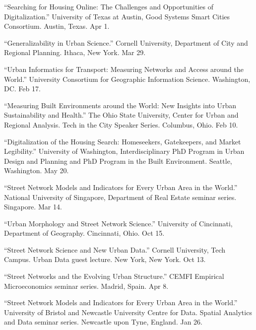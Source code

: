 \documentclass[11pt,a4paper]{report} %
\begin{document}
\begin{tablist}
\item[2024] \tab{}\enquote{Searching for Housing Online: The Challenges and Opportunities of Digitalization.} University of Texas at Austin, Good Systems Smart Cities Consortium. Austin, Texas. Apr 1.

\item[2024] \tab{}\enquote{Generalizability in Urban Science.} Cornell University, Department of City and Regional Planning. Ithaca, New York. Mar 29.

\item[2023] \tab{}\enquote{Urban Informatics for Transport: Measuring Networks and Access around the World.} University Consortium for Geographic Information Science. Washington, DC\@. Feb 17.

\item[2023] \tab{}\enquote{Measuring Built Environments around the World: New Insights into Urban Sustainability and Health.} The Ohio State University, Center for Urban and Regional Analysis. Tech in the City Speaker Series. Columbus, Ohio. Feb 10.

\item[2022] \tab{}\enquote{Digitalization of the Housing Search: Homeseekers, Gatekeepers, and Market Legibility.} University of Washington, Interdisciplinary PhD Program in Urban Design and Planning and PhD Program in the Built Environment. Seattle, Washington. May 20.

\item[2022] \tab{}\enquote{Street Network Models and Indicators for Every Urban Area in the World.} National University of Singapore, Department of Real Estate seminar series. Singapore. Mar 14.

\item[2021] \tab{}\enquote{Urban Morphology and Street Network Science.} University of Cincinnati, Department of Geography. Cincinnati, Ohio. Oct 15.

\item[2021] \tab{}\enquote{Street Network Science and New Urban Data.} Cornell University, Tech Campus. Urban Data guest lecture. New York, New York. Oct 13.

\item[2021] \tab{}\enquote{Street Networks and the Evolving Urban Structure.} CEMFI Empirical Microeconomics seminar series. Madrid, Spain. Apr 8.

\item[2021] \tab{}\enquote{Street Network Models and Indicators for Every Urban Area in the World.} University of Bristol and Newcastle University Centre for Data. Spatial Analytics and Data seminar series. Newcastle upon Tyne, England. Jan 26.


\end{tablist}
\end{document}
